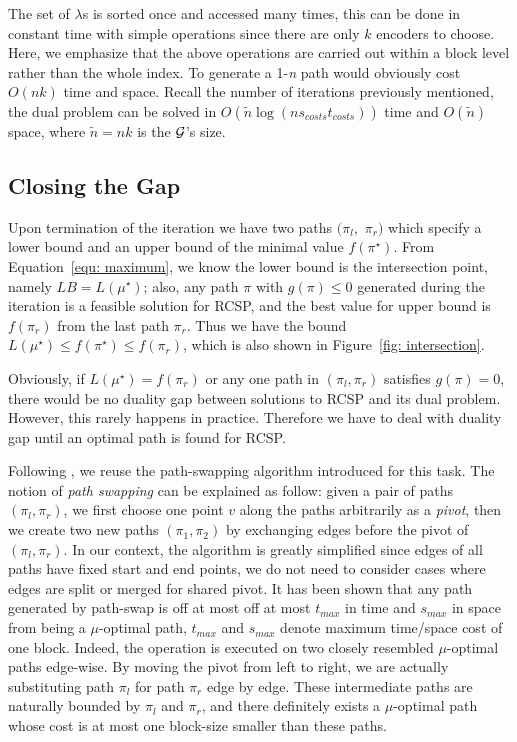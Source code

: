 \documentclass{sig-alternate-05-2015}
\begin{document}
The set of $ \lambda $s is sorted once and accessed many times, this can be done in constant time with simple operations since there are only $ k $ encoders to choose.
Here, we emphasize that the above operations are carried out within a block level rather than the whole index.
To generate a 1-\textit{n} path would obviously cost $ O(nk) $ time and space.
Recall the number of iterations previously mentioned, the dual problem can be solved in $ O(\tilde{n}\log(ns_{costs}t_{costs})) $ time and $ O(\tilde{n}) $ space, where $ \tilde{n} = nk $ is the $ \cal G $'s size.

\subsection{Closing the Gap}
Upon termination of the iteration we have two paths $ (\pi_l, $ $ \pi_r) $ which specify a lower bound and an upper bound of the minimal value $ f(\pi^\star) $.
From Equation~\eqref{equ: maximum}, we know the lower bound is the intersection point, namely $ LB = L(\mu^\star) $; also, any path $ \pi $ with $ g(\pi) \leqslant 0 $ generated during the iteration is a feasible solution for RCSP, and the best value for upper bound is $ f(\pi_r) $ from the last path $ \pi_r $.
Thus we have the bound $ L(\mu^\star) \leqslant f(\pi^\star) \leqslant f(\pi_r) $, which is also shown in Figure~\ref{fig: intersection}.

Obviously, if $ L(\mu^\star) = f(\pi_r) $ or any one path in $ (\pi_l,\pi_r) $ satisfies $ g(\pi) = 0 $, there would be no duality gap between solutions to RCSP and its dual problem.
However, this rarely happens in practice.
Therefore we have to deal with duality gap until an optimal path is found for RCSP.

Following \cite{farruggia2014bicriteria}, we reuse the path-swapping algorithm introduced for this task.
The notion of \textit{path swapping} can be explained as follow: given a pair of paths $ (\pi_l,\pi_r) $, we first choose one point $ v $ along the paths arbitrarily as a \textit{pivot}, then we create two new paths $ (\pi_1,\pi_2) $ by exchanging edges before the pivot of $ (\pi_l,\pi_r) $.
In our context, the algorithm is greatly simplified since edges of all paths have fixed start and end points, we do not need to consider cases where edges are split or merged for shared pivot.
It has been shown that any path generated by path-swap is off at most off at most $ t_{max} $ in time and $ s_{max} $ in space from being a $ \mu $-optimal path, $ t_{max} $ and $ s_{max} $ denote maximum time/space cost of one block.
Indeed, the operation is executed on two closely resembled $ \mu $-optimal paths edge-wise.
By moving the pivot from left to right, we are actually substituting path $ \pi_l $ for path $ \pi_r $ edge by edge.
These intermediate paths are naturally bounded by $ \pi_l $ and $ \pi_r $, and there definitely exists a $ \mu $-optimal path whose cost is at most one block-size smaller than these paths.
\end{document}
